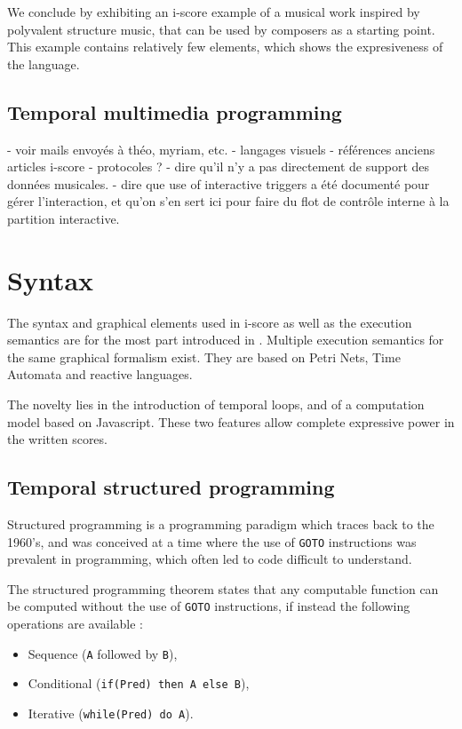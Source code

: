 \documentclass{article}
\begin{document}
We conclude by exhibiting an i-score example of a musical work inspired by polyvalent structure music,
that can be used by composers as a starting point. 
This example contains relatively few elements, which shows the expresiveness of the language.

\subsection{Temporal multimedia programming}
\cite{ackermann1994direct}\cite{song1999interactive}
- voir mails envoyés à théo, myriam, etc.
- langages visuels
- références anciens articles i-score 
- protocoles ?
- dire qu'il n'y a pas directement de support des données musicales.
- dire que use of interactive triggers a été documenté pour gérer l'interaction, 
et qu'on s'en sert ici pour faire du flot de contrôle interne à la partition interactive.
\section{Syntax}
The syntax and graphical elements used in i-score as well as the 
execution semantics are for the most part introduced in \cite{celerier2015ossia, baltazar2014score}.
Multiple execution semantics for the same graphical formalism exist. 
They are based on Petri Nets, Time Automata and reactive languages.

The novelty lies in the introduction of temporal loops, and of a computation model 
based on Javascript. These two features allow complete expressive power in the 
written scores.

\subsection{Temporal structured programming}
Structured programming is a programming paradigm which traces 
back to the 1960's, and was conceived at a time where the use of \lstinline{GOTO}
instructions was prevalent in programming, which often led to code difficult to understand.

The structured programming theorem\cite{bohm1966flow,mills1972mathematical} states that any computable function can be computed 
without the use of \lstinline{GOTO} instructions, if instead the following operations are available : 
\begin{itemize}
    \item Sequence (\lstinline{A} followed by \lstinline{B}), 
    \item Conditional (\lstinline{if(Pred) then A else B}), 
    \item Iterative (\lstinline{while(Pred) do A}).
\end{itemize}
\end{document}
